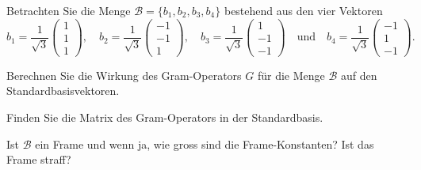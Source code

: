 Betrachten Sie die Menge $\mathcal{B}=\{b_1,b_2,b_3,b_4\}$ bestehend aus 
den vier Vektoren
\[
b_1
=
\frac{1}{\sqrt{3}}
\begin{pmatrix}
1\\1\\1
\end{pmatrix},\quad
b_2
=
\frac{1}{\sqrt{3}}
\begin{pmatrix}
-1\\-1\\1
\end{pmatrix},\quad
b_3
=
\frac{1}{\sqrt{3}}
\begin{pmatrix}
1\\-1\\-1
\end{pmatrix}
\quad\text{und}\quad
b_4
=
\frac{1}{\sqrt{3}}
\begin{pmatrix}
-1\\1\\-1
\end{pmatrix}.
\]
\begin{teilaufgaben}
\item
Berechnen Sie die Wirkung des Gram-Operators $G$ für die Menge $\mathcal{B}$
auf den Standardbasisvektoren.
\item
Finden Sie die Matrix des Gram-Operators in der Standardbasis.
\item
Ist $\mathcal{B}$ ein Frame und wenn ja, wie gross sind die Frame-Konstanten?
Ist das Frame straff?
\end{teilaufgaben}

